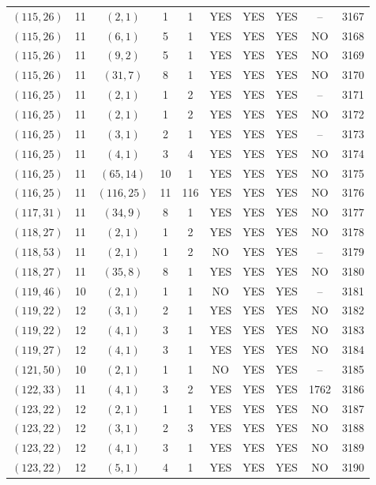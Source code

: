 \begin{longtable}{|c|c|c|c|c|c|c|c|c|c|}
$(115, 26)$ & 11 & $(2, 1)$ & 1 & 1 & YES & YES & YES & -- & 3167\\
$(115, 26)$ & 11 & $(6, 1)$ & 5 & 1 & YES & YES & YES & NO & 3168\\
$(115, 26)$ & 11 & $(9, 2)$ & 5 & 1 & YES & YES & YES & NO & 3169\\
$(115, 26)$ & 11 & $(31, 7)$ & 8 & 1 & YES & YES & YES & NO & 3170\\
$(116, 25)$ & 11 & $(2, 1)$ & 1 & 2 & YES & YES & YES & -- & 3171\\
$(116, 25)$ & 11 & $(2, 1)$ & 1 & 2 & YES & YES & YES & NO & 3172\\
$(116, 25)$ & 11 & $(3, 1)$ & 2 & 1 & YES & YES & YES & -- & 3173\\
$(116, 25)$ & 11 & $(4, 1)$ & 3 & 4 & YES & YES & YES & NO & 3174\\
$(116, 25)$ & 11 & $(65, 14)$ & 10 & 1 & YES & YES & YES & NO & 3175\\
$(116, 25)$ & 11 & $(116, 25)$ & 11 & 116 & YES & YES & YES & NO & 3176\\
$(117, 31)$ & 11 & $(34, 9)$ & 8 & 1 & YES & YES & YES & NO & 3177\\
$(118, 27)$ & 11 & $(2, 1)$ & 1 & 2 & YES & YES & YES & NO & 3178\\
$(118, 53)$ & 11 & $(2, 1)$ & 1 & 2 & NO & YES & YES & -- & 3179\\
$(118, 27)$ & 11 & $(35, 8)$ & 8 & 1 & YES & YES & YES & NO & 3180\\
$(119, 46)$ & 10 & $(2, 1)$ & 1 & 1 & NO & YES & YES & -- & 3181\\
$(119, 22)$ & 12 & $(3, 1)$ & 2 & 1 & YES & YES & YES & NO & 3182\\
$(119, 22)$ & 12 & $(4, 1)$ & 3 & 1 & YES & YES & YES & NO & 3183\\
$(119, 27)$ & 12 & $(4, 1)$ & 3 & 1 & YES & YES & YES & NO & 3184\\
$(121, 50)$ & 10 & $(2, 1)$ & 1 & 1 & NO & YES & YES & -- & 3185\\
$(122, 33)$ & 11 & $(4, 1)$ & 3 & 2 & YES & YES & YES & 1762 & 3186\\
$(123, 22)$ & 12 & $(2, 1)$ & 1 & 1 & YES & YES & YES & NO & 3187\\
$(123, 22)$ & 12 & $(3, 1)$ & 2 & 3 & YES & YES & YES & NO & 3188\\
$(123, 22)$ & 12 & $(4, 1)$ & 3 & 1 & YES & YES & YES & NO & 3189\\
$(123, 22)$ & 12 & $(5, 1)$ & 4 & 1 & YES & YES & YES & NO & 3190\\

\end{longtable}
